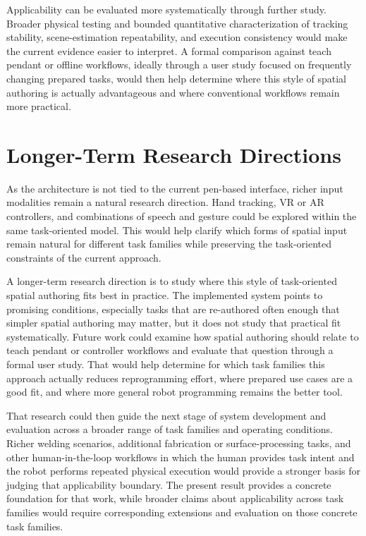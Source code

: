 Applicability can be evaluated more systematically through further study. Broader physical testing and bounded quantitative characterization of tracking stability, scene-estimation repeatability, and execution consistency would make the current evidence easier to interpret. A formal comparison against teach pendant or offline workflows, ideally through a user study focused on frequently changing prepared tasks, would then help determine where this style of spatial authoring is actually advantageous and where conventional workflows remain more practical.

\section{Longer-Term Research Directions}

As the architecture is not tied to the current pen-based interface, richer input modalities remain a natural research direction. Hand tracking, VR or AR controllers, and combinations of speech and gesture could be explored within the same task-oriented model. This would help clarify which forms of spatial input remain natural for different task families while preserving the task-oriented constraints of the current approach.

A longer-term research direction is to study where this style of task-oriented spatial authoring fits best in practice. The implemented system points to promising conditions, especially tasks that are re-authored often enough that simpler spatial authoring may matter, but it does not study that practical fit systematically. Future work could examine how spatial authoring should relate to teach pendant or controller workflows and evaluate that question through a formal user study. That would help determine for which task families this approach actually reduces reprogramming effort, where prepared use cases are a good fit, and where more general robot programming remains the better tool.

That research could then guide the next stage of system development and evaluation across a broader range of task families and operating conditions. Richer welding scenarios, additional fabrication or surface-processing tasks, and other human-in-the-loop workflows in which the human provides task intent and the robot performs repeated physical execution would provide a stronger basis for judging that applicability boundary. The present result provides a concrete foundation for that work, while broader claims about applicability across task families would require corresponding extensions and evaluation on those concrete task families.

